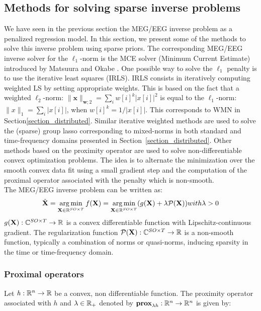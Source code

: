 \subsection{Methods for solving sparse inverse problems}
We have seen in the previous section the MEG/EEG inverse problem as a penalized regression model. In this section, we present some of the methods to solve this inverse problem using sparse priors. The corresponding MEG/EEG inverse solver for the $\ell_1$-norm is the MCE solver (Minimum Current Estimate) introduced by Matsuura and Okabe \cite{matsuura1995selective}. One possible way to solve the $\ell_1$ penalty is to use the iterative least squares (IRLS). IRLS consists in iteratively computing weighted LS by setting appropriate weights. This is based on the fact that a weighted $\ell_2$-norm: $\|\mathbf{x}\|_{\mathbf{w};2}=\sum_i w[i]^k |x[i]|^2$ is equal to the $\ell_1$-norm: $\|x\|_1=\sum_i|x[i]|$, when $w[i]^k=1/|x[i]|$. This corresponds to WMN in Section\ref{section_distributed}. Similar iterative weighted methods are used to solve the (sparse) group lasso corresponding to mixed-norms in both standard and time-frequency domains presented in Section~\ref{section_distributed}. Other methods based on the proximity operator are used to solve non-differentiable convex optimization problems. The idea is to alternate the minimization over the smooth convex data fit using a small gradient step and the computation of the proximal operator associated with the penalty which is non-smooth.\\

The MEG/EEG inverse problem can be written as:
\begin{equation}
\hat{\mathbf{X}} = \mathop{\mathrm{arg}\,\mathrm{min}}_{\mathbf{X}\in\mathbb{R}^{SO\times T}}f(\mathbf{X}) = \mathop{\mathrm{arg}\,\mathrm{min}}_{\mathbf{X}\in\mathbb{R}^{SO\times T}}(g(\mathbf{X}) + \lambda\mathcal{P}(\mathbf{X})) with \lambda>0
\end{equation}
$g(\mathbf{X}):\mathbb{C}^{SO\times T}\rightarrow\mathbb{R}$ is a convex differentiable function with Lipschitz-continuous gradient. The regularization function $\mathcal{P}(\mathbf{X}):\mathbb{C}^{SO\times T}\rightarrow\mathbb{R}$ is a non-smooth function, typically a combination of norms or quasi-norms, inducing sparsity in the time or time-frequency domain.

\subsubsection*{Proximal operators}
Let $\mathit{h}:\mathbb{R}^n\rightarrow\mathbb{R}$ be a convex, non differentiable function. The proximity operator associated with $\mathit{h}$ and $\lambda\in\mathbb{R}_+$ denoted by
$\textbf{prox}_{\lambda\mathit{h}}:\mathbb{R}^n\rightarrow\mathbb{R}^n$ is given by:

